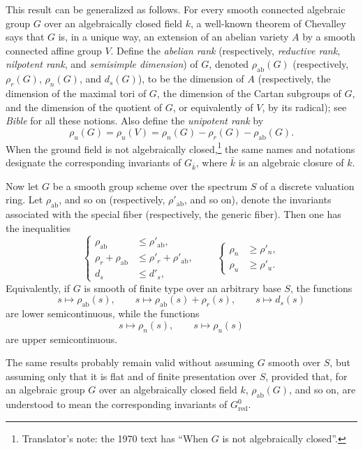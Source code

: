 This result can be generalized as follows. For every smooth connected
algebraic group \(G\) over an algebraically closed field \(k\), a
well-known theorem of Chevalley says that \(G\) is, in a unique way, an
extension of an abelian variety \(A\) by a smooth connected affine group
\(V\). Define the \emph{abelian rank} (respectively, \emph{reductive rank},
\emph{nilpotent rank}, and \emph{semisimple dimension}) of \(G\), denoted
\(\rho_{\mathrm{ab}}(G)\) (respectively,
\(\rho_r(G)\), \(\rho_n(G)\), and \(d_s(G)\)), to be the dimension of
\(A\) (respectively, the dimension of the maximal tori of \(G\), the
dimension of the Cartan subgroups of \(G\), and the dimension of the
quotient of \(G\), or equivalently of \(V\), by its radical); see
\emph{Bible} for all these notions. Also define the \emph{unipotent rank}
by
\[
  \rho_u(G)=\rho_u(V)
  =\rho_n(G)-\rho_r(G)-\rho_{\mathrm{ab}}(G).
\]
When the ground field is not algebraically closed,\footnote{Translator's
note: the 1970 text has ``When \(G\) is not algebraically closed''.} the
same names and
notations designate the corresponding invariants of \(G_{\bar{k}}\),
where \(\bar{k}\) is an algebraic closure of \(k\).

Now let \(G\) be a smooth group scheme over the spectrum \(S\) of a
discrete valuation ring. Let \(\rho_{\mathrm{ab}}\), and so on
(respectively, \(\rho'_{\mathrm{ab}}\), and so on), denote the invariants
associated with the special fiber (respectively, the generic fiber). Then
one has the inequalities
\[
  \left\{
  \begin{aligned}
    \rho_{\mathrm{ab}}&\leq \rho'_{\mathrm{ab}},\\
    \rho_r+\rho_{\mathrm{ab}}&\leq
      \rho'_r+\rho'_{\mathrm{ab}},\\
    d_s&\leq d'_s,
  \end{aligned}
  \right.
  \qquad
  \left\{
  \begin{aligned}
    \rho_n&\geq \rho'_n,\\
    \rho_u&\geq \rho'_u.
  \end{aligned}
  \right.
\]
Equivalently, if \(G\) is smooth of finite type over an arbitrary base
\(S\), the functions
\[
  s\longmapsto \rho_{\mathrm{ab}}(s),\qquad
  s\longmapsto \rho_{\mathrm{ab}}(s)+\rho_r(s),\qquad
  s\longmapsto d_s(s)
\]
are lower semicontinuous, while the functions
\[
  s\longmapsto \rho_n(s),\qquad
  s\longmapsto \rho_u(s)
\]
are upper semicontinuous.

The same results probably remain valid without assuming \(G\) smooth over
\(S\), but assuming only that it is flat and of finite presentation over
\(S\), provided that, for an algebraic group \(G\) over an algebraically
closed field \(k\), \(\rho_{\mathrm{ab}}(G)\), and so on, are understood
to mean the corresponding invariants of \(G_{\mathrm{red}}^0\).

